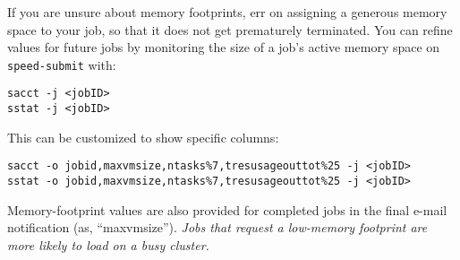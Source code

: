 If you are unsure about memory footprints, err on assigning a generous
memory space to your job, so that it does not get prematurely terminated.
You can refine
values for future jobs by monitoring the size of a job's active
memory space on \texttt{speed-submit} with:


\begin{verbatim}
sacct -j <jobID>
sstat -j <jobID>
\end{verbatim}

\noindent
This can be customized to show specific columns:

\begin{verbatim}
sacct -o jobid,maxvmsize,ntasks%7,tresusageouttot%25 -j <jobID>
sstat -o jobid,maxvmsize,ntasks%7,tresusageouttot%25 -j <jobID>
\end{verbatim}

Memory-footprint values are also provided for completed jobs in the final
e-mail notification (as, ``maxvmsize'').
%
\emph{Jobs that request a low-memory footprint are more likely to load on a busy
cluster.}
